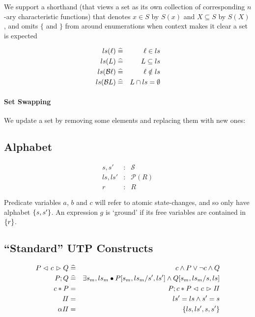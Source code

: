 We support a shorthand (that views a set as its own collection
of corresponding $n$-ary characteristic functions)
that denotes $x \in S$ by $S(x)$ and $ X \subseteq S$ by $S(X)$,
and omits $\{$ and $\}$ from around enumerations when context makes
it clear a set is expected

\begin{eqnarray*}
   ls(\ell) &\mathrel{\widehat=}& \ell \in ls
\\ ls(L) &\mathrel{\widehat=}& L \subseteq ls
\\ ls(\mathcal{B}\ell) &\mathrel{\widehat=}& \ell \notin ls
\\ ls(\mathcal{B} L) &\mathrel{\widehat=}& L \cap ls = \emptyset
\end{eqnarray*}


\paragraph{Set Swapping}

We update a set by removing some elements
and replacing them with new ones:

\subsection{Alphabet}

\begin{eqnarray*}
   s, s' &:& \mathcal S
\\ ls, ls' &:& \mathcal P (R)
\\ r &:& R
\end{eqnarray*}

Predicate variables $a$, $b$ and $c$
will refer to atomic state-changes,
and so only have alphabet $\{{s,s'}\}$.
An expression $g$ is `ground' if its free variables are contained in $\{{r}\}$.

\subsection{``Standard'' UTP Constructs}

\begin{eqnarray*}
   P \mathrel{\lhd ~ {c} ~ \rhd} Q
   &\mathrel{\widehat=}&
   c \land P \lor \lnot c \land Q
\\ P ; Q
   &\mathrel{\widehat=}&
   \exists s_m,ls_m \bullet P[s_m,ls_m/s',ls'] \land Q[s_m,ls_m/s,ls]
\\ c * P
   &=&
   P ; c * P \mathrel{\lhd ~ {c} ~ \rhd} \mathit{II}
\\ \mathit{II} &=& ls'=ls \land s'=s
\\ \alpha \mathit{II} &=& \{{ls,ls',s,s'}\}
\end{eqnarray*}

